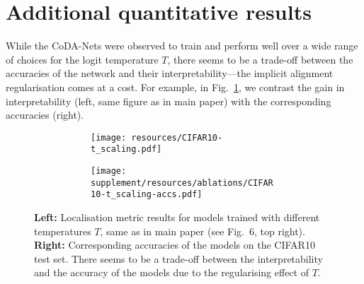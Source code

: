 \section{Additional quantitative results}
\label{sec:additional_quantitative}

While the CoDA-Nets were observed to train and perform well over a wide range of choices for the logit temperature $T$, there seems to be a trade-off between the accuracies of the network and their interpretability---the implicit alignment regularisation comes at a cost. For example, in Fig.~\ref{fig:T_ablation}, we contrast the gain in interpretability (left, same figure as in main paper) with the corresponding accuracies (right). 
\begin{figure}
\centering
    \begin{subfigure}[c]{\textwidth}
    \centering
    \begin{subfigure}[c]{0.45\textwidth}
    \centering
    \texttt{[image: resources/CIFAR10-t\_scaling.pdf]}
    \end{subfigure}
    \begin{subfigure}[c]{0.45\textwidth}
    \centering
\texttt{[image: supplement/resources/ablations/CIFAR10-t\_scaling-accs.pdf]}
    \end{subfigure}
    \vspace{.75em}
    \end{subfigure}
    \caption{\textbf{Left:} Localisation metric results for models trained with different temperatures $T$, same as in main paper (see Fig.~6, top right). 
    \textbf{Right:} Corresponding accuracies of the models on the CIFAR10 test set. There seems to be a trade-off between the interpretability and the accuracy of the models due to the regularising effect of $T$.}
    \label{fig:T_ablation}
\end{figure}

